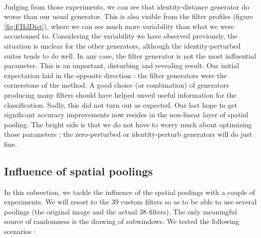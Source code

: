 \documentclass[a4paper]{report}
\begin{document}
	\paragraph{}
	Judging from those experiments, we can see that identity-distance generator do worse than our usual generator. This is also visible from the filter profiles (figure \ref{fig:FIIdDist}), where we can see much more variability than what we were accustomed to.
	Considering the variability we have observed previously, the situation is unclear for the other generators, although the identity-perturbed suites tends to do well. In any case, the filter generator is not the most influential parameter. This is an important, disturbing and revealing result. Our initial expectation laid in the opposite direction : the filter generators were the cornerstone of the method. A good choice (or combination) of generators producing many filters should have helped unveil useful information for the classification. Sadly, this did not turn out as expected. Our last hope to get significant accuracy improvements now resides in the non-linear layer of spatial pooling.
	The bright side is that we do not have to worry much about optimizing those parameters ; the zero-perturbed or identity-perturb generators will do just fine.
	
	
	\subsection{Influence of spatial poolings}
	In this subsection, we tackle the influence of the spatial poolings with a couple of experiments. We will resort to the 39 custom filters so as to be able to use several poolings (the original image and the actual 38 filters). The only meaningful source of randomness is the drawing of subwindows. We tested the following scenarios : 
	
\end{document}
